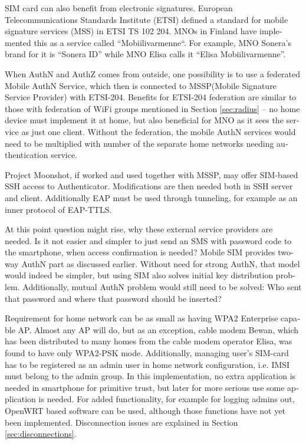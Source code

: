 \documentclass[12pt,a4paper,english]{tutthesis}
\begin{document}
\begin{otherlanguage}{english}
SIM card can also benefit from electronic signatures.
European Telecommunications Standards Institute (ETSI) defined a
standard for mobile signature services (MSS) in ETSI TS 102 204.
MNOs in Finland have implemented this as a 
service called ``Mobiilivarmenne``. 
For example, MNO Sonera's brand for  it is ``Sonera ID'' while MNO Elisa calls it
``Elisa Mobiilivarmenne''.

When AuthN and AuthZ comes from outside, one possibility is to use a
federated Mobile AuthN Service, which then is connected to  MSSP(Mobile
Signature Service Provider) with ETSI-204. Benefits for ETSI-204
federation are similar to those with federation of WiFi groups
mentioned in Section \ref{sec:radius} -- no home device must implement it at home,
but also beneficial for  MNO as it sees the service as just one
client.  Without the federation, the mobile AuthN services would need to be
multiplied with number of the separate home networks  needing authentication service.



Project Moonshot\cite{moonshot}, if worked and used together with MSSP, may offer
SIM-based SSH access to Authenticator. Modifications are then needed 
both in SSH server and client. Additionally EAP must be used through
tunneling, for example as an inner protocol of EAP-TTLS.

At this point question might rise, why these external service
providers are needed. Is it not easier and simpler to just send 
an SMS with password code to the smartphone, when access confirmation is needed?
Mobile SIM provides two-way AuthN part as discussed earlier.
Without need for strong AuthN, that model would indeed be 
simpler, but using SIM also solves initial key distribution problem.
Additionally, mutual AuthN problem would still need to be solved:
Who sent that password and where that password should be inserted?





Requirement for home network can be as small as having WPA2 Enterprise capable
AP. Almost any AP will do, but as an exception, cable modem Bewan, which 
has been distributed to many homes from the cable modem operator Elisa, was found to have only WPA2-PSK mode.
Additionally, managing user's SIM-card has to be registered as an admin user in home network 
configuration, i.e. IMSI must belong to the admin group.
In this implementation, no extra application is needed in smartphone
for primitive trust, but later for more serious use some application is needed.
For added functionality, for example for logging admins out, OpenWRT
based software can be used, although those functions have not yet been
implemented. Disconnection issues are explained in Section
\ref{sec:disconnections}.


\end{otherlanguage}
\end{document}
